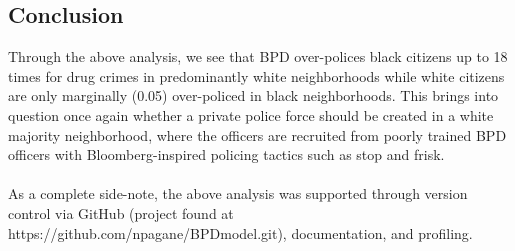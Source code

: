 \documentclass[10pt]{article}
\begin{document}
\subsection*{Conclusion}
 Through the above analysis, we see that BPD over-polices black citizens up to 18 times for drug crimes in predominantly white neighborhoods while white citizens are only marginally (0.05) over-policed in black neighborhoods. This brings into question once again whether a private police force should be created in a white majority neighborhood, where the officers are recruited from poorly trained BPD officers with Bloomberg-inspired policing tactics such as stop and frisk. \\
 \\
 As a complete side-note, the above analysis was supported through version control via GitHub (project found at https://github.com/npagane/BPDmodel.git), documentation, and profiling.

 
\end{document}

